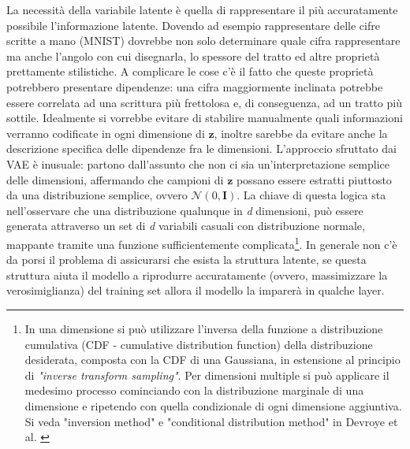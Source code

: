 La necessità della variabile latente è quella di rappresentare il più accuratamente possibile l'informazione latente. Dovendo ad esempio rappresentare delle cifre scritte a mano (MNIST) dovrebbe non solo determinare quale cifra rappresentare ma anche l'angolo con cui disegnarla, lo spessore del tratto ed altre proprietà prettamente stilistiche. A complicare le cose c'è il fatto che queste proprietà potrebbero presentare dipendenze: una cifra maggiormente inclinata potrebbe essere correlata ad una scrittura più frettolosa e, di conseguenza, ad un tratto più sottile. Idealmente si vorrebbe evitare di stabilire manualmente quali informazioni verranno codificate in ogni dimensione di $\boldsymbol{z}$, inoltre sarebbe da evitare anche la descrizione specifica delle dipendenze fra le dimensioni. L'approccio sfruttato dai VAE è inusuale: partono dall'assunto che non ci sia un'interpretazione semplice delle dimensioni, affermando che campioni di $\boldsymbol{z}$ possano essere estratti piuttosto da una distribuzione semplice, ovvero $\mathcal{N}(0, \boldsymbol{I})$. La chiave di questa logica sta nell'osservare che una distribuzione qualunque in \textit{d} dimensioni, può essere generata attraverso un set di \textit{d} variabili casuali con distribuzione normale, mappante tramite una funzione sufficientemente complicata\footnote{In una dimensione si può utilizzare l'inversa della funzione a distribuzione cumulativa (CDF - cumulative distribution function) della distribuzione desiderata, composta con la CDF di una Gaussiana, in estensione al principio di \textit{"inverse transform sampling"}. Per dimensioni multiple si può applicare il medesimo processo cominciando con la distribuzione marginale di una dimensione e ripetendo con quella condizionale di ogni dimensione aggiuntiva. Si veda "inversion method" e "conditional distribution method" in Devroye et al. \cite{rvg}}. In generale non c'è da porsi il problema di assicurarsi che esista la struttura latente, se questa struttura aiuta il modello a riprodurre accuratamente (ovvero, massimizzare la verosimiglianza) del training set allora il modello la imparerà in qualche layer.

